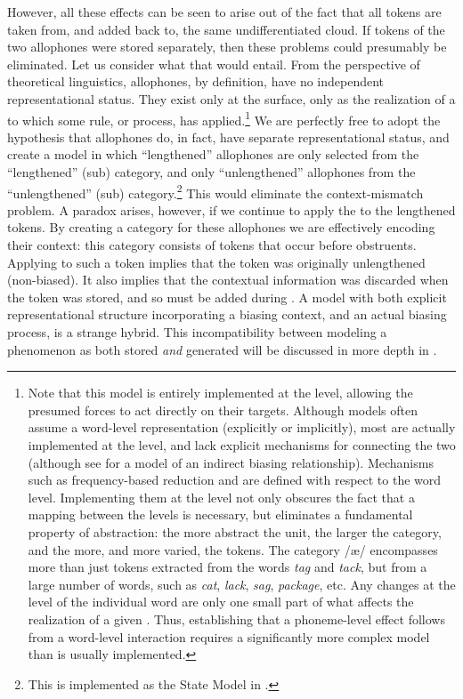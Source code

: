 However, all these effects can be seen to arise out of the fact that
all tokens are taken from, and added back to, the same undifferentiated
cloud. If tokens of the two allophones were stored separately, then
these problems could presumably be eliminated. Let us consider what
that would entail. From the perspective of theoretical linguistics,
allophones, by definition, have no independent representational status.
They exist only at the surface, only as the realization of a 
to which some rule, or process, has applied.\footnote{Note that this model is entirely implemented at the  level,
allowing the presumed forces to act directly on their targets. Although
 models often assume a word-level representation (explicitly
or implicitly), most are actually implemented at the  level,
and lack explicit mechanisms for connecting the two (although see
\citet{Wedel2008} for a model of an indirect biasing relationship).
Mechanisms such as frequency-based reduction and 
are defined with respect to the word level. Implementing them at the
 level not only obscures the fact that a mapping between
the levels is necessary, but eliminates a fundamental property of
abstraction: the more abstract the unit, the larger the category,
and the more, and more varied, the tokens. The  category {/æ/}
encompasses more than just tokens extracted from the words \textit{tag}
and \textit{tack}, but from a large number of words, such as \textit{cat},
\textit{lack}, \textit{sag}, \textit{package}, etc. Any changes at the
level of the individual word are only one small part of what affects
the realization of a given . Thus, establishing that a phoneme-level
effect follows from a word-level interaction requires a significantly
more complex model than is usually implemented. } We are perfectly free to adopt the hypothesis that allophones do,
in fact, have separate representational status, and create a model
in which “lengthened” allophones are only selected from the
“lengthened” (sub) category, and only “unlengthened” allophones
from the “unlengthened” (sub) category.\footnote{This is implemented as the State Model in .}
This would eliminate the context-mismatch problem. A paradox arises,
however, if we continue to apply the   to the lengthened
tokens. By creating a category for these allophones we are effectively
encoding their context: this category consists of tokens that occur
before  obstruents. Applying  to such a token implies
that the token was originally unlengthened (non-biased). It also implies
that the contextual information was discarded when the token was stored,
and so must be added during . A model with both explicit
representational structure incorporating a biasing context, and an
actual biasing process, is a strange hybrid. This incompatibility
between modeling a phenomenon as both stored \emph{and} generated
will be discussed in more depth in . 

